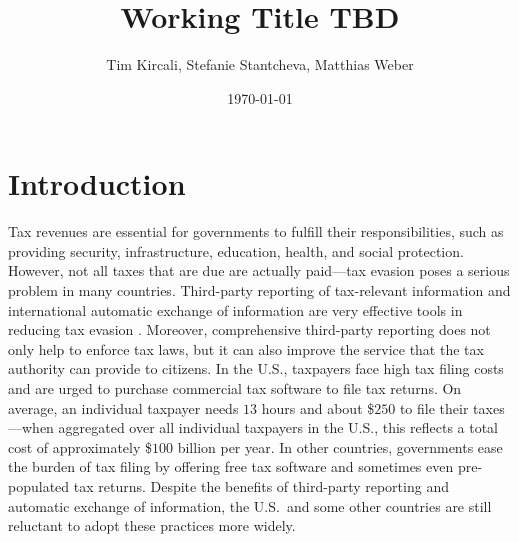 \documentclass[12pt]{article}
\title{\textbf{\large{Working Title TBD}}}
\author{\normalsize{Tim Kircali, Stefanie Stantcheva, Matthias Weber}}
\date{\normalsize{\today}}
\begin{document}
\maketitle
{}



\section{Introduction}
Tax revenues are essential for governments to fulfill their responsibilities, such as providing security, infrastructure, education, health, and social protection. However, not all taxes that are due are actually paid---tax evasion poses a serious problem in many countries. Third-party reporting of tax-relevant information and international automatic exchange of information are very effective tools in reducing tax evasion \parencite{kleven2011unwilling, pomeranz2015no, slemrod2017does, boas2024taxing}. Moreover, comprehensive third-party reporting does not only help to enforce tax laws, but it can also improve the service that the tax authority can provide to citizens. In the U.S., taxpayers face high tax filing costs and are urged to purchase commercial tax software to file tax returns. On average, an individual taxpayer needs $13$ hours and about \$$250$ to file their taxes \parencite[][]{IRS2022}---when aggregated over all individual taxpayers in the U.S., this reflects a total cost of approximately \$$100$ billion per year. %
In other countries, governments ease the burden of tax filing by offering free tax software and sometimes even pre-populated tax returns. Despite the benefits of third-party reporting and automatic exchange of information, the U.S.\ and some other countries are still reluctant to adopt these practices more widely.
\end{document}
